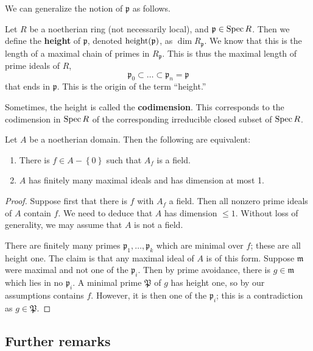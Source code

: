 We can generalize the notion of $\mathfrak{p}$ as follows.
\begin{definition} 
Let $R$ be a noetherian ring (not necessarily local), and $\mathfrak{p} \in
\operatorname{Spec} R$. Then we define the \textbf{height} of $\mathfrak{p}$, denoted
$\operatorname{height}(\mathfrak{p})$, as $\dim R_{\mathfrak{p}}$.
We know that this is the length of a maximal chain of primes in
$R_{\mathfrak{p}}$. This is thus the maximal length of prime ideals of $R$, 
\[ \mathfrak{p}_0 \subset \dots \subset \mathfrak{p}_n = \mathfrak{p}  \]
that ends in $\mathfrak{p}$. This is the origin of the term ``height.''
\end{definition} 

\begin{remark} 
Sometimes, the height is called the \textbf{codimension}. This corresponds to
the codimension in $\operatorname{Spec} R$ of the corresponding irreducible closed subset of
$\operatorname{Spec} R$.
\end{remark} 

\begin{theorem}
Let $A$ be a noetherian domain. Then the following are equivalent:
\begin{enumerate}
\item There is $f \in A-\left\{0\right\} $ such that $A_f$ is a field.
\item $A$ has finitely many maximal ideals and has dimension at most 1.
\end{enumerate}
\end{theorem} 
\begin{proof} 
Suppose first that there is $f$ with $A_f$ a field. 
Then all nonzero prime ideals of $A$ contain $f$. 
We need to deduce that $A$ has dimension $\leq 1$. Without loss of generality,
we may assume that $A$ is not a field.

There are finitely many primes $\mathfrak{p}_1,\dots, \mathfrak{p}_k$ which
are minimal over $f$; these are all height one. The claim is that any maximal ideal of $A$ is of this
form. Suppose $\mathfrak{m}$ were maximal and not one of the $\mathfrak{p}_i$.
Then by prime avoidance, there is $g \in \mathfrak{m}$ which
lies in no $\mathfrak{p}_i$. A minimal prime $\mathfrak{P}$ of $g$ has height
one, so by our assumptions contains $f$. However, it is then one of the
$\mathfrak{p}_i$; this is a contradiction as $g \in \mathfrak{P}$.
\end{proof} 


\subsection{Further remarks}

